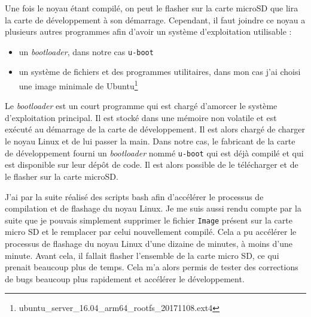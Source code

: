 Une fois le noyau étant compilé, on peut le flasher sur la carte microSD que lira la carte de développement à son démarrage. Cependant, il faut joindre ce noyau a plusieurs autres programmes afin d'avoir un système d'exploitation utilisable : 
\begin{itemize}
    \item un \textit{bootloader}, dans notre cas \texttt{u-boot}
    \item un système de fichiers et des programmes utilitaires, dans mon cas j'ai choisi une image minimale de Ubuntu\footnote{ubuntu\_server\_16.04\_arm64\_rootfs\_20171108.ext4}
\end{itemize}

Le \textit{bootloader} est un court programme qui est chargé d'amorcer le système d'exploitation principal. Il est stocké dans une mémoire non volatile et est exécuté au démarrage de la carte de développement. Il est alors chargé de charger le noyau Linux et de lui passer la main. Dans notre cas, le fabricant de la carte de développement fourni un \textit{bootloader} nommé \texttt{u-boot} qui est déjà compilé et qui est disponible sur leur dépôt de code. Il est alors possible de le télécharger et de le flasher sur la carte microSD.

J'ai par la suite réalisé des scripts bash afin d'accélérer le processus de compilation et de flashage du noyau Linux. Je me suis aussi rendu compte par la suite que je pouvais simplement supprimer le fichier \texttt{Image} présent sur la carte micro SD et le remplacer par celui nouvellement compilé. Cela a pu accélérer le processus de flashage du noyau Linux d'une dizaine de minutes, à moins d'une minute. Avant cela, il fallait flasher l'ensemble de la carte micro SD, ce qui prenait beaucoup plus de temps. Cela m'a alors permis de tester des corrections de bugs beaucoup plus rapidement et accélérer le développement.